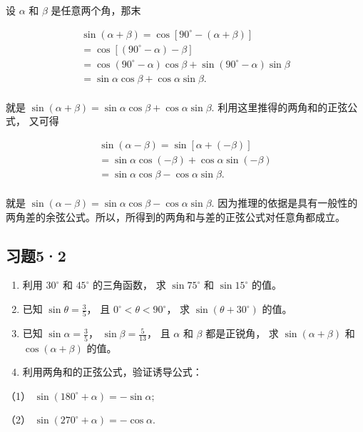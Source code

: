 设 \(\alpha\) 和 \(\beta\) 是任意两个角，那末

\[
\begin{array}{l} \sin (\alpha + \beta) = \cos [ 90 ^{\circ} - (\alpha + \beta) ] \\ = \cos [ (90 ^{\circ} - \alpha) - \beta ] \\ = \cos (90 ^{\circ} - \alpha) \cos \beta + \sin (90 ^{\circ} - \alpha) \sin \beta \\ = \sin \alpha \cos \beta + \cos \alpha \sin \beta . \\ \end{array}
\]

就是
\(\sin (\alpha +\beta) = \sin \alpha \cos \beta +\cos \alpha \sin \beta .\)
利用这里推得的两角和的正弦公式， 又可得

\[
\begin{array}{l} \sin (\alpha - \beta) = \sin [ \alpha + (- \beta) ] \\ = \sin \alpha \cos (- \beta) + \cos \alpha \sin (- \beta) \\ = \sin \alpha \cos \beta - \cos \alpha \sin \beta . \\ \end{array}
\]

就是
\(\sin (\alpha -\beta) = \sin \alpha \cos \beta -\cos \alpha \sin \beta .\)
因为推理的依据是具有一般性的两角差的余弦公式。所以，所得到的两角和与差的正弦公式对任意角都成立。

\subsection{习题5·2}

\begin{enumerate}
\item
  利用 \(30^{\circ}\) 和 \(45^{\circ}\) 的三角函数， 求
  \(\sin 75^{\circ}\) 和 \(\sin 15^{\circ}\) 的值。
\item
  已知 \(\sin \theta = \frac{3}{5}\)， 且
  \(0^{\circ} < \theta < 90^{\circ}\)， 求
  \(\sin (\theta + 30^{\circ})\) 的值。
\item
  已知 \(\sin \alpha = \frac{3}{5}\)， \(\sin \beta = \frac{5}{13}\)，
  且 \(\alpha\) 和 \(\beta\) 都是正锐角， 求 \(\sin (\alpha + \beta)\)
  和 \(\cos (\alpha + \beta)\) 的值。
\item
  利用两角和的正弦公式，验证诱导公式：
\end{enumerate}

（1） \(\sin (180^{\circ} + \alpha) = -\sin \alpha;\)

（2） \(\sin (270^{\circ} + \alpha) = -\cos \alpha.\)

